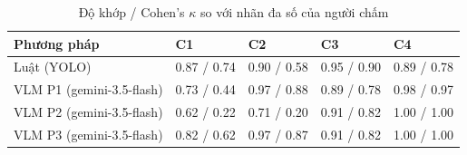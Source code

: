 \begin{table}[t]
\centering
\caption{Độ khớp / Cohen's $\kappa$ so với nhãn đa số của người chấm}
\footnotesize
\begin{tabular}{lllll}
\hline
Phương pháp & C1 & C2 & C3 & C4 \\
\hline
Luật (YOLO) & 0.87 / 0.74 & 0.90 / 0.58 & 0.95 / 0.90 & 0.89 / 0.78 \\
VLM P1 (gemini-3.5-flash) & 0.73 / 0.44 & 0.97 / 0.88 & 0.89 / 0.78 & 0.98 / 0.97 \\
VLM P2 (gemini-3.5-flash) & 0.62 / 0.22 & 0.71 / 0.20 & 0.91 / 0.82 & 1.00 / 1.00 \\
VLM P3 (gemini-3.5-flash) & 0.82 / 0.62 & 0.97 / 0.87 & 0.91 / 0.82 & 1.00 / 1.00 \\
\hline
\end{tabular}
\end{table}
